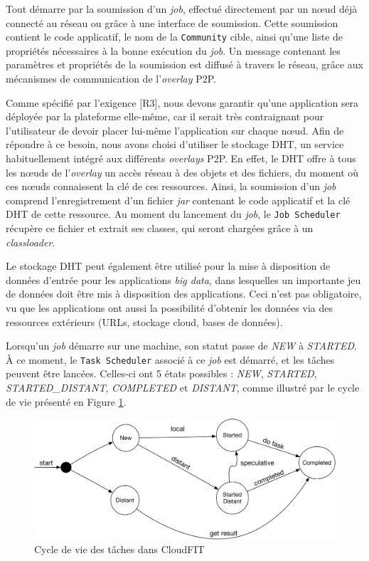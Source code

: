 Tout démarre par la soumission d'un \textit{job}, effectué directement par un n{\oe}ud déjà connecté au réseau ou grâce à une interface de soumission. Cette soumission contient le code applicatif, le nom de la \texttt{Community} cible, ainsi qu'une liste de propriétés nécessaires à la bonne exécution du \textit{job}. Un message contenant les paramètres et propriétés de la soumission est diffusé à travers le réseau, grâce aux mécanismes de communication de l'\textit{overlay} P2P.

Comme spécifié par l'exigence [R3], nous devons garantir qu'une application sera déployée par la plateforme elle-même, car il serait très contraignant pour l'utilisateur de devoir placer lui-même l'application sur chaque n{\oe}ud. Afin de répondre à ce besoin, nous avons choisi d'utiliser le stockage DHT, un service habituellement intégré aux différents \textit{overlays} P2P. En effet, le DHT offre à tous les n{\oe}uds de l'\textit{overlay} un accès réseau à des objets et des fichiers, du moment où ces n{\oe}uds connaissent la clé de ces ressources. Ainsi, la soumission d'un \textit{job} comprend l'enregistrement d'un fichier \textit{jar} contenant le code applicatif et la clé DHT de cette ressource. Au moment du lancement du \textit{job}, le \texttt{Job Scheduler} récupère ce fichier et extrait ses classes, qui seront chargées grâce à un \textit{classloader}. 

Le stockage DHT peut également être utilisé pour la mise à disposition de données d'entrée pour les applications \textit{big data}, dans lesquelles un importante jeu de données doit être mis à disposition des applications. Ceci n'est pas obligatoire, vu que les applications ont aussi la possibilité d'obtenir les données via des ressources extérieurs (URLs, stockage cloud, bases de données).

Lorsqu'un \textit{job} démarre sur une machine, son statut passe de \textit{NEW} à \textit{STARTED}. À ce moment, le \texttt{Task Scheduler} associé à ce \textit{job} est démarré, et les tâches peuvent être lancées. Celles-ci ont 5 états possibles : \textit{NEW}, \textit{STARTED}, \textit{STARTED\_DISTANT}, \textit{COMPLETED} et \textit{DISTANT}, comme illustré par le cycle de vie présenté en Figure \ref{fig:etatsTasks}.

\begin{figure}
	\centering
	\includegraphics[width=0.65\linewidth]{img/lifecycle}
	\caption{Cycle de vie des tâches dans CloudFIT}\label{fig:etatsTasks}
\end{figure}

